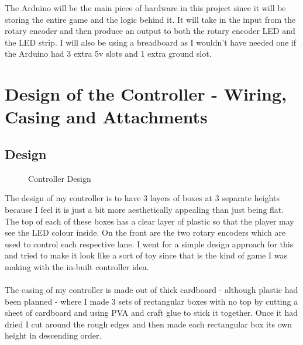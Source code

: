 \documentclass{article}
\begin{document}
The Arduino will be the main piece of hardware in this project since it will be storing the entire game and the logic behind it. It will take in the input from the rotary encoder and then produce an output to both the rotary encoder LED and the LED strip. I will also be using a breadboard as I wouldn't have needed one if the Arduino had 3 extra 5v slots and 1 extra ground slot.

\section{Design of the Controller - Wiring, Casing and Attachments}
\subsection{Design}

\begin{figure}[ht]%
    \centering
    \qquad
    \qquad
    \caption{Controller Design}%
    \label{fig:controller-design}%
\end{figure}

The design of my controller is to have 3 layers of boxes at 3 separate heights because I feel it is just a bit more aesthetically appealing than just being flat. The top of each of these boxes has a clear layer of plastic so that the player may see the LED colour inside. On the front are the two rotary encoders which are used to control each respective lane. I went for a simple design approach for this and tried to make it look like a sort of toy since that is the kind of game I was making with the in-built controller idea.
\\
\\
The casing of my controller is made out of thick cardboard - although plastic had been planned - where I made 3 sets of rectangular boxes with no top by cutting a sheet of cardboard and using PVA and craft glue to stick it together. Once it had dried I cut around the rough edges and then made each rectangular box its own height in descending order.
\end{document}
